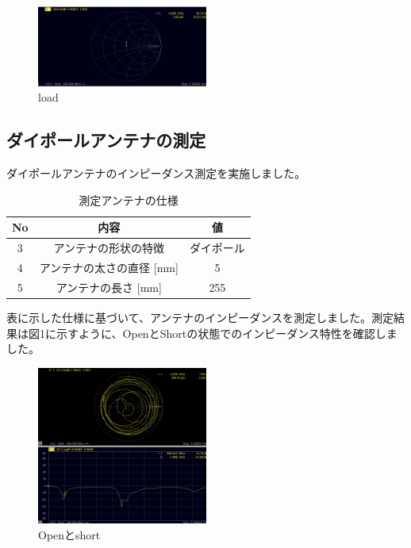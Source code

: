 \documentclass[a4paper,11pt,xelatex,ja=standard]{bxjsarticle}
\begin{document}
        \begin{figure}[H]
            \centering
            \includegraphics[width=0.5\textwidth]{./img/24-3/2.png}
            \caption{load}
        \end{figure}

    \subsection{ダイポールアンテナの測定}
        ダイポールアンテナのインピーダンス測定を実施しました。
        
        \begin{table}[H]
            \centering
            \begin{tabular}{|c|c|c|}
                \hline
                No & 内容 & 値 \\
                \hline
                3 & アンテナの形状の特徴 &  ダイポール\\
                \hline
                4 & アンテナの太さの直径 [mm] &  5\\
                \hline
                5 & アンテナの長さ [mm] &  255\\
                \hline
            \end{tabular}
            \caption{測定アンテナの仕様}
        \end{table}

        表に示した仕様に基づいて、アンテナのインピーダンスを測定しました。測定結果は図1に示すように、OpenとShortの状態でのインピーダンス特性を確認しました。

        \begin{figure}[H]
            \centering
            \includegraphics[width=0.5\textwidth]{./img/24-3/3.png}
            \caption{Openとshort}
        \end{figure}
\end{document}
